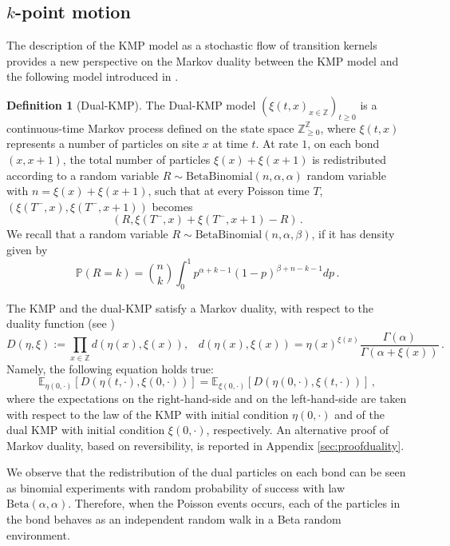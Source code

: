 \documentclass[a4paper,11pt,oneside,reqno]{amsart}
\theoremstyle{definition}
\newtheorem{definition}[theorem]{Definition}
\renewcommand{\geq}{\geqslant}
\numberwithin{equation}{section}
\begin{document}
\subsection{$k$-point motion} 

The description of the KMP model as a stochastic flow of transition kernels provides a new perspective on the Markov duality between the KMP model and the following model introduced in  \cite{kipnis1982heat,modelsOfTransport}. 
\begin{definition}[Dual-KMP]
	\label{def:dualKMP}
    The Dual-KMP model $(\xi(t,x)_{x\in\mathbb{Z}})_{t \geq 0}$ is a continuous-time Markov process defined on the state space $\mathbb{Z}_{\geq 0}^{\mathbb{Z}}$, where $\xi(t,x)$ represents a number of particles on site $x$ at time $t$. At rate $1$, on each bond $(x,x+1)$, the total  number of particles $\xi(x)+\xi(x+1)$ is redistributed according to a random variable  $R \sim  \mathrm{BetaBinomial}(n, \alpha, \alpha)$ random variable with  $n=\xi(x)+\xi(x+1)$, such that at every Poisson time $T$,  $(\xi(T^-,x), \xi(T^-,x+1))$ becomes
    $$ (R, \xi(T^-,x)+ \xi(T^-,x+1)-R)\,. $$
    We recall that a random variable $R\sim \text{BetaBinomial}(n,\alpha,\beta)$, if it has density given by $$ \mathbb{P}(R=k)=\binom{n}{k}\int_{0}^{1}p^{\alpha+k-1}(1-p)^{\beta+n-k-1}dp\,.$$ 
\end{definition}


The KMP and the dual-KMP satisfy a Markov duality, with respect to the duality function (see \cite{kipnis1982heat,modelsOfTransport})
\begin{equation*}
    D(\eta,\xi):=\prod_{x\in \mathbb{Z}}d(\eta(x),\xi(x)), \hspace{10pt}
    d(\eta(x),\xi(x))=\eta(x)^{\xi(x)}\frac{\Gamma(\alpha)}{\Gamma(\alpha+\xi(x))}\,.
\end{equation*}
Namely, the following equation holds true:
\begin{equation}\label{duality-relation}
    \mathbb E_{\eta(0,\cdot)}\left[ D(\eta(t,\cdot),\xi(0,\cdot))\right]=\mathbb E_{\xi(0,\cdot)}\left[ D(\eta(0,\cdot),\xi(t,\cdot))\right]\,,
\end{equation}
where the expectations on the right-hand-side and on the left-hand-side are taken with respect to the law of the KMP with initial condition $\eta(0,\cdot)$ and of the dual KMP with initial condition $\xi(0,\cdot)$, respectively. An alternative proof of Markov duality, based on reversibility, is reported in Appendix \ref{sec:proofduality}.


We observe that the redistribution of the dual particles on each bond can be seen as binomial experiments with random probability of success with law $\text{Beta}(\alpha,\alpha)$. Therefore, when the Poisson events occurs, each of the particles in the bond behaves as an independent random walk in a Beta random environment. 
\end{document}
